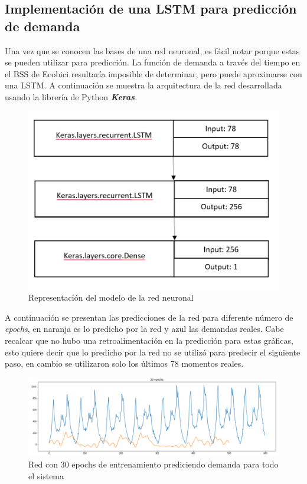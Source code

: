 \documentclass[12pt,spanish]{article}
\begin{document}
	\subsection{Implementación de una LSTM para predicción de demanda}
	Una vez que se conocen las bases de una red neuronal, es fácil notar porque estas se pueden utilizar para predicción. La función de demanda a través del tiempo en el BSS de Ecobici resultaría imposible de determinar, pero puede aproximarse con una LSTM. A continuación se muestra la arquitectura de la red desarrollada usando la librería de Python \textit{\textbf{Keras}}.\\
	\begin{figure}[H]
		\centering
		\includegraphics[width=15cm]{Imagenes/model_description.PNG}
		\begin{centering}
			\caption{Representación del modelo de la red neuronal}
		\end{centering}
	\end{figure}
	A continuación se presentan las predicciones de la red para diferente número de \textit{epochs}, en naranja es lo predicho por la red y azul las demandas reales. Cabe recalcar que no hubo una retroalimentación en la predicción para estas gráficas, esto quiere decir que lo predicho por la red no se utilizó para predecir el siguiente paso, en cambio se utilizaron solo los últimos 78 momentos reales.
	\begin{figure}[H]
		\centering
		\includegraphics[width=15cm]{Imagenes/full_30_epochs.PNG}
		\begin{centering}
			\caption{Red con 30 epochs de entrenamiento prediciendo demanda para todo el sistema}
		\end{centering}
	\end{figure}
\end{document}
